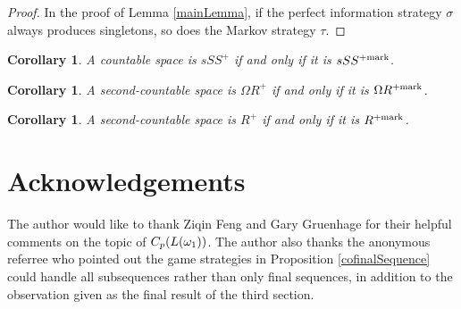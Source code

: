 \documentclass{amsart}
\theoremstyle{plain}
\newtheorem{corollary}[theorem]{Corollary}
\theoremstyle{definition}
\theoremstyle{remark}
\theoremstyle{plain}
\theoremstyle{definition}
\theoremstyle{remark}
\begin{document}
\begin{proof}
  In the proof of Lemma \ref{mainLemma},
  if the perfect information strategy \(\sigma\) always
  produces singletons, so does the Markov strategy \(\tau\).
\end{proof}

\begin{corollary}
  A countable space is \(sSS^+\) if and only if it is
  \(sSS^{+\mathrm{mark}}\).
\end{corollary}

\begin{corollary}
  A second-countable space is \(\Omega R^+\) if and only if
  it is \(\Omega R^{+\mathrm{mark}}\).
\end{corollary}

\begin{corollary}
  A second-countable space is \(R^+\) if and only if
  it is \(R^{+\mathrm{mark}}\).
\end{corollary}

\section{Acknowledgements}
The author would like to thank Ziqin Feng and Gary Gruenhage
for their helpful comments on the topic of \(C_p(L(\omega_1))\).
The author also thanks the anonymous referree who pointed out
the game strategies in Proposition \ref{cofinalSequence} could handle all
subsequences rather than only final sequences, in addition to the
observation given as the final result of the third section.



\end{document}
